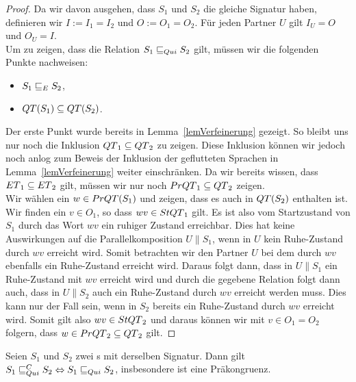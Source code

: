 \begin{proof}
  Da wir davon ausgehen, dass $S_1$ und $S_2$ die gleiche Signatur haben,
  definieren wir $I:=I_1=I_2$ und $O:=O_1=O_2$. Für jeden Partner $U$ gilt
  $I_U=O$ und $O_U=I$.\\
  Um zu zeigen, dass die Relation $S_1\sqsubseteq _{Qui} S_2$ gilt, müssen wir die
  folgenden Punkte nachweisen:
  \begin{itemize}
    \item $S_1\sqsubseteq _E S_2$,
    \item $QT{}(S_1)\subseteq QT{}(S_2)$.
  \end{itemize}
  Der erste Punkt wurde bereits in Lemma~\ref{lemVerfeinerung}
  gezeigt. So bleibt uns nur noch die Inklusion $QT{}_1\subseteq QT{}_2$ zu
  zeigen. Diese Inklusion können wir jedoch noch anlog zum Beweis der Inklusion
  der geflutteten Sprachen in Lemma~\ref{lemVerfeinerung} weiter einschränken.
  Da wir bereits wissen, dass $ET{}_1\subseteq ET{}_2$ gilt, müssen wir nur
  noch $PrQT{}_1\subseteq QT{}_2$ zeigen.\\
  Wir wählen ein $w\in PrQT{}(S_1)$ und zeigen, dass es auch in $QT{}(S_2)$
  enthalten ist.\\
  Wir finden ein $v\in O_1$, so dass $wv\in StQT{}_1$ gilt. Es ist also vom
  Startzustand von $S_1$ durch das Wort $wv$ ein ruhiger Zustand erreichbar.
  Dies hat keine Auswirkungen auf die Parallelkomposition $U\|S_1$, wenn in $U$
  kein Ruhe-Zustand durch $wv$ erreicht wird. Somit betrachten wir den Partner
  $U$ bei dem durch $wv$ ebenfalls ein Ruhe-Zustand erreicht wird. Daraus folgt
  dann, dass in $U\|S_1$ ein Ruhe-Zustand mit $wv$ erreicht wird und durch die
  gegebene Relation folgt dann auch, dass in $U\|S_2$ auch ein Ruhe-Zustand
  durch $wv$ erreicht werden muss. Dies kann nur der Fall sein, wenn in $S_2$
  bereits ein Ruhe-Zustand durch $wv$ erreicht wird. Somit gilt also $wv\in
  StQT{}_2$ und daraus können wir mit $v\in O_1=O_2$ folgern, dass $w\in
  PrQT{}_2\subseteq QT{}_2$ gilt.
\end{proof}

\begin{satz}
  \label{satzQuiFullAbst}
  Seien $S_1$ und $S_2$ zwei \EIO{}s mit derselben Signatur. Dann gilt
  $S_1\sqsubseteq _{Qui}^C S_2\Leftrightarrow S_1\sqsubseteq _{Qui} S_2$, insbesondere ist \QRel{} eine
  Präkongruenz.
\end{satz}

